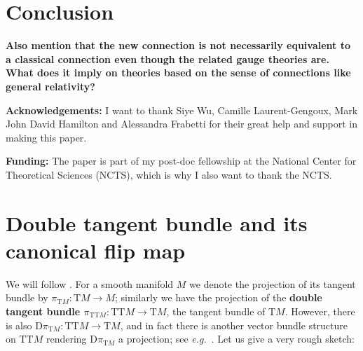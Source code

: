 \documentclass[a4paper,oneside,11pt,bibliography=totoc]{scrartcl}
\renewcommand{\theequation}{\arabic{equation}}
\renewcommand{\listoffigures}{\begingroup
\tocsection
\tocfile{\listfigurename}{lof}
\endgroup}
\renewcommand{\listoftables}{\begingroup
\tocsection
\tocfile{\listtablename}{lot}
\endgroup}
\theoremstyle{plain}
\theoremstyle{remark}
\theoremstyle{definition}
\begin{document}
\section{Conclusion}\label{conclusions}

\textbf{Also mention that the new connection is not necessarily equivalent to a classical connection even though the related gauge theories are. What does it imply on theories based on the sense of connections like general relativity?}

\textbf{Acknowledgements:} I want to thank Siye Wu, Camille Laurent-Gengoux, Mark John David Hamilton and Alessandra Frabetti for their great help and support in making this paper.

\textbf{Funding:} The paper is part of my post-doc fellowship at the National Center for Theoretical Sciences (NCTS), which is why I also want to thank the NCTS.





\appendix
\setcounter{equation}{0}
\renewcommand{\theequation}{\Alph{section}.\arabic{equation}} %

\renewcommand\refname{List of References}






\section{Double tangent bundle and its canonical flip map}\label{DoubleTangentFlip}

We will follow \cite[\S 9.6, page 363]{mackenzieGeneralTheory}. For a smooth manifold $M$ we denote the projection of its tangent bundle by $\pi_{\mathrm{T}M}: \mathrm{T}M \to M$; similarly we have the projection of the \textbf{double tangent bundle $\pi_{\mathrm{TT}M}: \mathrm{TT}M \to \mathrm{T}M$}, the tangent bundle of $\mathrm{T}M$. However, there is also $\mathrm{D}\pi_{\mathrm{T}M}: \mathrm{TT}M \to \mathrm{T}M$, and in fact there is another vector bundle structure on $\mathrm{TT}M$ rendering $\mathrm{D}\pi_{\mathrm{T}M}$ a projection; see \textit{e.g.}\ \cite[\S 3.4 \textit{et seq.}; page 110ff.]{mackenzieGeneralTheory}. Let us give a very rough sketch:
\end{document}
